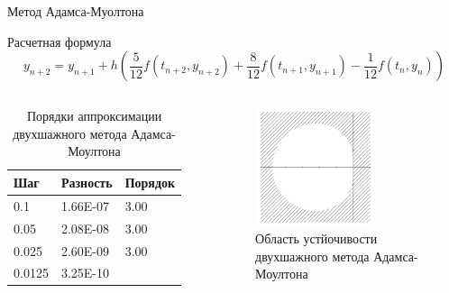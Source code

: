 \documentclass[ignoreonframetext,unicode]{beamer}
\begin{document}
\begin{frame}{Метод Адамса-Муолтона}
		
	\begin{block}{Расчетная формула}	
		\[
		y_{n+2} = y_{n+1} + h \left( \frac{5}{12} f(t_{n+2},y_{n+2}) + \frac{8}{12} f(t_{n+1},y_{n+1}) - \frac{1}{12} f(t_n,y_n) \right)
		\]
	\end{block}

	\begin{columns}
	\begin{table}[hbt!]
		\centering
		\begin{tabular}{|l|l|l|} 
			\hline
			Шаг      & Разность     & Порядок            \\ 
			\hline
			0.1    & 1.66E-07 & 3.00  \\ 
			\hline
			0.05   & 2.08E-08 & 3.00   \\ 
			\hline
			0.025  & 2.60E-09 & 3.00  \\ 
			\hline
			0.0125 & 3.25E-10 &              \\
			\hline
		\end{tabular}
		\vspace*{2mm}
		\label{table-Adams-2}
		\caption{Порядки аппроксимации двухшажного метода Адамса-Моултона}
	\end{table}

	\vspace{-4mm}
	\begin{figure}[hbt!]
		\centering
		\includegraphics[width=0.7\textwidth]{lin-stab-a-m-2}%
		\caption{Область устйочивости двухшажного метода Адамса-Моултона}
		\vspace*{-2mm}
		\label{lin-stab-a-m-2}
	\end{figure}
	\end{columns}
	
\end{frame}	
\end{document}
